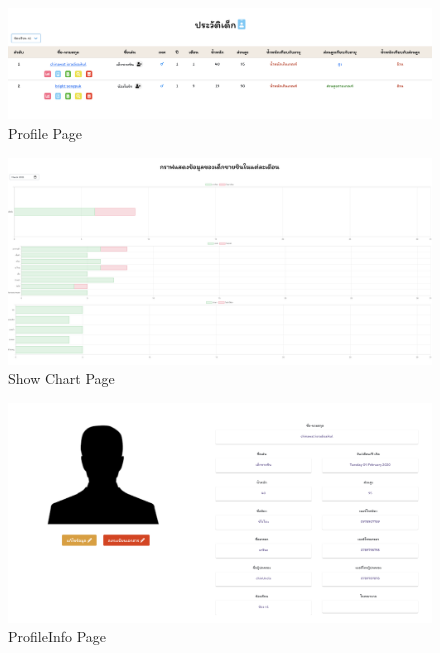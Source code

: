 \begin{figure}
  \begin{center}
  \includegraphics[width=\linewidth]{images/Profile.png}
  \end{center}
  \caption[หน้าโปรไฟล์]{Profile Page}
  \label{fig:Profile}
  \end{figure}

\begin{figure}
  \begin{center}
  \includegraphics[width=\linewidth]{images/ChartPage.png}
  \end{center}
  \caption[หน้าแสดงข้อมูลรายเดือนเด็ก]{Show Chart Page}
  \label{fig:ChartPage}
  \end{figure}
  
\begin{figure}
  \begin{center}
  \includegraphics[width=\linewidth]{images/ProfileInfo.png}
  \end{center}
  \caption[หน้าประวัติส่วนตัวเด็ก]{ProfileInfo Page}
  \label{fig:ProfileTwo}
  \end{figure}

